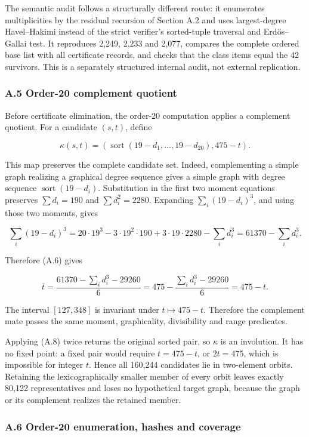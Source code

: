 \documentclass[
  english,
  11pt,
  a4paper,
]{article}
\begin{document}
The semantic audit follows a structurally different route: it enumerates
multiplicities by the residual recursion of Section A.2 and uses
largest-degree Havel--Hakimi instead of the strict verifier's
sorted-tuple traversal and Erdős--Gallai test. It reproduces 2,249,
2,233 and 2,077, compares the complete ordered base list with all
certificate records, and checks that the class items equal the 42
survivors. This is a separately structured internal audit, not external
replication.

\subsubsection{A.5 Order-20 complement
quotient}\label{a.5-order-20-complement-quotient}

Before certificate elimination, the order-20 computation applies a
complement quotient. For a candidate \((s,t)\), define

\[
\kappa(s,t)=
\left(\operatorname{sort}(19-d_1,\ldots,19-d_{20}),475-t\right).
\tag{A.8}
\]

This map preserves the complete candidate set. Indeed, complementing a
simple graph realizing a graphical degree sequence gives a simple graph
with degree sequence \(\operatorname{sort}(19-d_i)\). Substitution in
the first two moment equations preserves \(\sum d_i=190\) and
\(\sum d_i^2=2280\). Expanding \(\sum_i(19-d_i)^3\), and using those two
moments, gives

\[
\sum_i(19-d_i)^3
=20\cdot19^3-3\cdot19^2\cdot190+3\cdot19\cdot2280-\sum_i d_i^3
=61370-\sum_i d_i^3.
\]

Therefore (A.6) gives

\[
\overline t
=\frac{61370-\sum_i d_i^3-29260}{6}
=475-\frac{\sum_i d_i^3-29260}{6}
=475-t.
\]

The interval \([127,348]\) is invariant under \(t\mapsto475-t\).
Therefore the complement mate passes the same moment, graphicality,
divisibility and range predicates.

Applying (A.8) twice returns the original sorted pair, so \(\kappa\) is
an involution. It has no fixed point: a fixed pair would require
\(t=475-t\), or \(2t=475\), which is impossible for integer \(t\). Hence
all 160,244 candidates lie in two-element orbits. Retaining the
lexicographically smaller member of every orbit leaves exactly 80,122
representatives and loses no hypothetical target graph, because the
graph or its complement realizes the retained member.

\subsubsection{A.6 Order-20 enumeration, hashes and
coverage}\label{a.6-order-20-enumeration-hashes-and-coverage}
\end{document}
